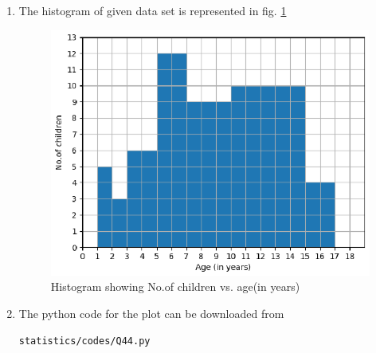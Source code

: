 \renewcommand{\theequation}{\theenumi}
\begin{enumerate}[label=\thesection.\arabic*.,ref=\thesection.\theenumi]
\item The histogram of given data set is represented in fig. \ref{fig:Q44}
\begin{figure}[!ht]
\centering
\includegraphics[width= \columnwidth]{./statistics/figs/Q44.eps}
\caption{Histogram showing No.of children vs. age(in years)}
\label{fig:Q44}
\end{figure}
\item The python code for the plot can be downloaded from
\begin{lstlisting}
statistics/codes/Q44.py
\end{lstlisting}

\end{enumerate}